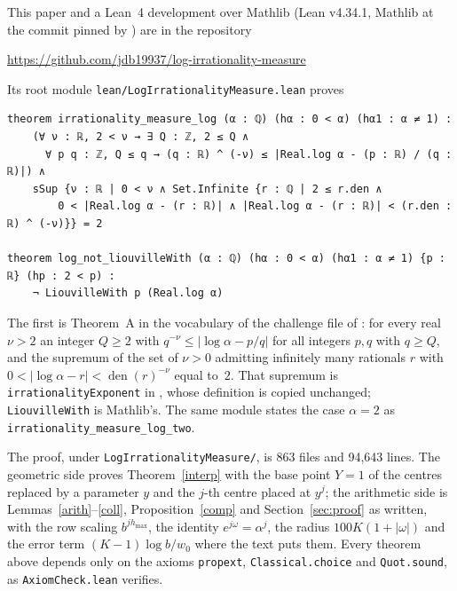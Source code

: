 \documentclass[11pt]{amsart}
\begin{document}
This paper and a Lean~4 development over Mathlib (Lean v4.34.1, Mathlib at the commit pinned by \cite{OAI}) are in the repository
\begin{center}\url{https://github.com/jdb19937/log-irrationality-measure}\end{center}
Its root module \texttt{lean/LogIrrationalityMeasure.lean} proves
\begin{lstlisting}
theorem irrationality_measure_log (α : ℚ) (hα : 0 < α) (hα1 : α ≠ 1) :
    (∀ ν : ℝ, 2 < ν → ∃ Q : ℤ, 2 ≤ Q ∧
      ∀ p q : ℤ, Q ≤ q → (q : ℝ) ^ (-ν) ≤ |Real.log α - (p : ℝ) / (q : ℝ)|) ∧
    sSup {ν : ℝ | 0 < ν ∧ Set.Infinite {r : ℚ | 2 ≤ r.den ∧
        0 < |Real.log α - (r : ℝ)| ∧ |Real.log α - (r : ℝ)| < (r.den : ℝ) ^ (-ν)}} = 2

theorem log_not_liouvilleWith (α : ℚ) (hα : 0 < α) (hα1 : α ≠ 1) {p : ℝ} (hp : 2 < p) :
    ¬ LiouvilleWith p (Real.log α)
\end{lstlisting}
The first is Theorem~A in the vocabulary of the challenge file of \cite{OAI}: for every real $\nu>2$ an integer $Q\ge2$ with $q^{-\nu}\le|\log\alpha-p/q|$ for all integers $p,q$ with $q\ge Q$, and the supremum of the set of $\nu>0$ admitting infinitely many rationals $r$ with $0<|\log\alpha-r|<\operatorname{den}(r)^{-\nu}$ equal to~$2$. That supremum is \texttt{irrationalityExponent} in \cite{OAI}, whose definition is copied unchanged; \texttt{LiouvilleWith} is Mathlib's. The same module states the case $\alpha=2$ as \texttt{irrationality\_measure\_log\_two}.

The proof, under \texttt{LogIrrationalityMeasure/}, is 863 files and 94{,}643 lines. The geometric side proves Theorem~\ref{interp} with the base point $Y=1$ of the centres replaced by a parameter $y$ and the $j$-th centre placed at $y^j$; the arithmetic side is Lemmas~\ref{arith}--\ref{coll}, Proposition~\ref{comp} and Section~\ref{sec:proof} as written, with the row scaling $b^{jh_{\max}}$, the identity $e^{j\omega}=\alpha^j$, the radius $100K(1+|\omega|)$ and the error term $(K-1)\log b/w_0$ where the text puts them. Every theorem above depends only on the axioms \texttt{propext}, \texttt{Classical.choice} and \texttt{Quot.sound}, as \texttt{AxiomCheck.lean} verifies.
\end{document}
